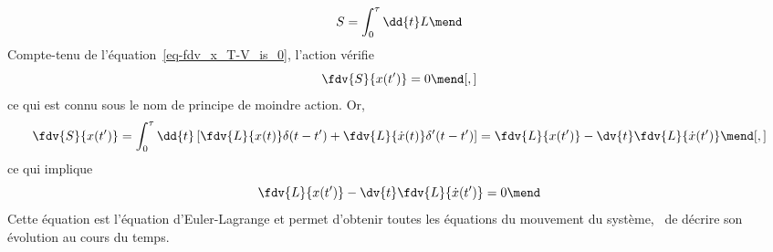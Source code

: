 \begin{equation}
S = \int_0^\tau\dd{t}L
\mend
\end{equation}
Compte-tenu de l'équation~\eqref{eq-fdv_x_T-V_is_0}, l'action vérifie
\begin{equation}
\fdv{S}{x(t')}=0
\mend[,]
\end{equation}
ce qui est connu sous le nom de principe de moindre action. Or,
\begin{equation}
\fdv{S}{x(t')}
= \int_0^\tau\dd{t} \left[ \fdv{L}{x(t)}\delta(t-t') + \fdv{L}{\dot{x}(t)}\delta'(t-t')\right]
= \fdv{L}{x(t')} - \dv{t}\fdv{L}{\dot{x}(t')}
\mend[,]
\end{equation}
ce qui implique
\begin{equation}
\fdv{L}{x(t')} - \dv{t}\fdv{L}{\dot{x}(t')} = 0
\mend
\end{equation}
Cette équation est l'équation d'Euler-Lagrange et permet d'obtenir toutes les équations du mouvement du système, \ie\ de décrire son évolution au cours du temps.

